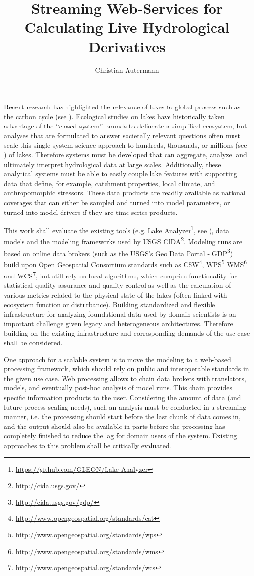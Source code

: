 \documentclass[paper=a4,fontsize=11pt]{scrartcl}
\title{Streaming Web-Services for Calculating Live Hydrological Derivatives}
\author{Christian Autermann}
\newcommand{\fu}[1]{\footnote{\url{#1}}}
\begin{document}
    \maketitle
    \onehalfspacing

    Recent research has highlighted the relevance of lakes to global process such as the carbon cycle (see \cite{cole}).
    Ecological studies on lakes have historically taken advantage of the “closed system” bounds to delineate a simplified ecosystem, but analyses that are formulated to answer societally relevant questions often must scale this single system science approach to hundreds, thousands, or millions (see \cite{downing}) of lakes.
    Therefore systems must be developed that can aggregate, analyze, and ultimately interpret hydrological data at large scales. Additionally, these analytical systems must be able to easily couple lake features with supporting data that define, for example, catchment properties, local climate, and anthropomorphic stressors.
    These data products are readily available as national coverages that can either be sampled and turned into model parameters, or turned into model drivers if they are time series products.

    This work shall evaluate the existing tools (e.g. Lake Analyzer\fu{https://github.com/GLEON/Lake-Analyzer}, see \cite{lakeanalyzer}), data models and the modeling frameworks used by USGS CIDA\fu{http://cida.usgs.gov/}.
    Modeling runs are based on online data brokers (such as the USGS’s Geo Data Portal - GDP\fu{http://cida.usgs.gov/gdp/}) build upon Open Geospatial Consortium standards such as CSW\fu{http://www.opengeospatial.org/standards/cat}, WPS\fu{http://www.opengeospatial.org/standards/wps} WMS\fu{http://www.opengeospatial.org/standards/wms} and WCS\fu{http://www.opengeospatial.org/standards/wcs}, but still rely on local algorithms, which comprise functionality for statistical quality assurance and quality control as well as the calculation of various metrics related to the physical state of the lakes (often linked with ecosystem function or disturbance). Building standardized and flexible infrastructure for analyzing foundational data used by domain scientists is an important challenge given legacy and heterogeneous architectures.
    Therefore building on the existing infrastructure and corresponding demands of the use case shall be considered.

    One approach for a scalable system is to move the modeling to a web-based processing framework, which should rely on public and interoperable standards in the given use case.
    Web processing allows to chain data brokers with translators, models, and eventually post-hoc analysis of model runs.
    This chain provides specific information products to the user.
    Considering the amount of data (and future process scaling needs), such an analysis must be conducted in a streaming manner, i.e. the processing should start before the last chunk of data comes in, and the output should also be available in parts before the processing has completely finished to reduce the lag for domain users of the system.
    Existing approaches to this problem shall be critically evaluated.
\end{document}
